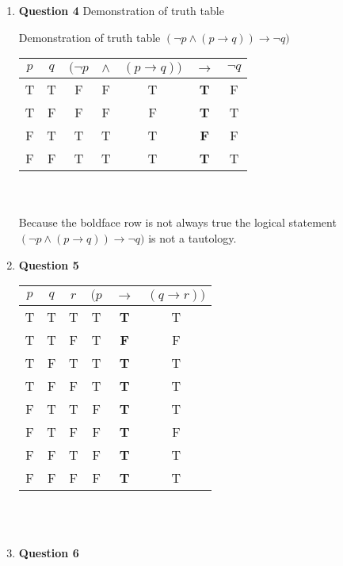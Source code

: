 \documentclass[12pt]{article}
\begin{document}
\begin{enumerate}
\item {\bf Question 4} Demonstration of truth table


Demonstration of truth table $(\lnot p \land (p \rightarrow q)) \rightarrow \lnot q)$\\

\begin{tabular}{c|c|ccccc}
$p$ & $q$ & $(\lnot p $ & $\land$ & $(p \rightarrow q))$ & $\rightarrow$ & $\lnot q$\\ \hline
T & T & F & F & T & \textbf{T} & F\\
T & F & F & F & F & \textbf{T} & T\\
F & T & T & T & T & \textbf{F} & F\\
F & F & T & T & T & \textbf{T} & T\\
\end{tabular}\\\\
Because the boldface row is not always true the logical statement \\
$(\lnot p \land (p \rightarrow q)) \rightarrow \lnot q)$ is not a tautology. 
\item {\bf{Question 5}}

\begin{tabular}{c|c|c|ccc}
$p$ & $q$ & $r$ & $(p $ & $\rightarrow$ & $(q \rightarrow r))$\\ \hline
T & T & T & T & \textbf{T} & T\\
T & T & F & T & \textbf{F} & F\\
T & F & T & T & \textbf{T} & T\\
T & F & F & T & \textbf{T} & T\\
F & T & T & F & \textbf{T} & T\\
F & T & F & F & \textbf{T} & F\\
F & F & T & F & \textbf{T} & T\\
F & F & F & F & \textbf{T} & T\\
\end{tabular}\\\\

\item {\bf{Question 6}}


\end{enumerate}
\end{document}
